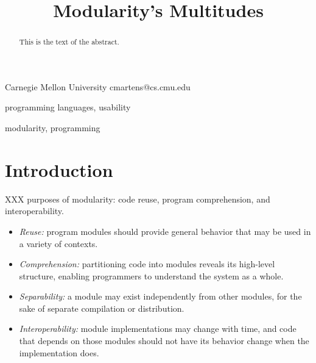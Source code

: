 \documentclass{sigplanconf}
\begin{document}
\setlength{\pdfpageheight}{\paperheight}
\setlength{\pdfpagewidth}{\paperwidth}






\title{Modularity's Multitudes}

           {Carnegie Mellon University}
           {cmartens@cs.cmu.edu}

\maketitle

\begin{abstract}
This is the text of the abstract.
\end{abstract}


\terms
programming languages, usability

\keywords
modularity, programming

\section{Introduction}

XXX purposes of modularity: code reuse, program comprehension, and
interoperability.

\begin{itemize}
  \item {\em Reuse:} program modules should provide general behavior
    that may be used in a variety of contexts.
  \item {\em Comprehension:} partitioning code into modules reveals
    its high-level structure, enabling programmers to understand the system
    as a whole.
  \item {\em Separability:} a module may exist independently from other
    modules, for the sake of separate compilation or distribution.
  \item {\em Interoperability:} module implementations may change with
    time, and code that depends on those modules should not have its
    behavior change when the implementation does.
\end{itemize}
\end{document}
